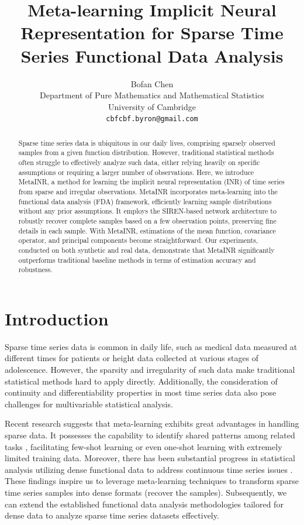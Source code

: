 \documentclass{article}
\title{Meta-learning Implicit Neural Representation for Sparse Time Series Functional Data Analysis}
\author{%
  Bofan Chen\\
  Department of Pure Mathematics and Mathematical Statistics\\
  University of Cambridge\\
  \texttt{cbfcbf.byron@gmail.com} \\}
\begin{document}
\maketitle

\begin{abstract}
  Sparse time series data is ubiquitous in our daily lives, comprising sparsely observed samples from a given function distribution.
  However, traditional statistical methods often struggle to effectively analyze such data, either relying heavily on specific assumptions or requiring a larger number of observations.  Here, we introduce MetaINR, a method for learning the implicit neural representation (INR) of time series from sparse and irregular observations.
  MetaINR incorporates meta-learning into the functional data analysis (FDA) framework, 
  efficiently learning sample distributions without any prior assumptions.
  It employs the SIREN-based network architecture to robustly recover complete samples based on a few observation points, preserving fine details in each sample. 
  With MetaINR, estimations of the mean function, covariance operator, and principal components become straightforward.
  Our experiments, conducted on both synthetic and real data, demonstrate that MetaINR significantly outperforms traditional baseline methods in terms of estimation accuracy and robustness.
\end{abstract}

\section{Introduction}
Sparse time series data is common in daily life, such as medical data measured at different times for patients or height data collected at various stages of adolescence. 
However, the sparsity and irregularity of such data make traditional statistical methods hard to apply directly. 
Additionally, the consideration of continuity and differentiability properties in most time series data also pose challenges for multivariable statistical analysis.

Recent research suggests that meta-learning \cite{finn2017model,hospedales2021meta,beck2023survey} exhibits great advantages in handling sparse data. 
It possesses the capability to identify shared patterns among related tasks \cite{raghu2019rapid}, 
facilitating few-shot learning or even one-shot learning \cite{sun2019meta} with extremely limited training data. 
Moreover, there has been substantial progress in statistical analysis utilizing dense functional data to address continuous time series issues \cite{wang2016functional}. 
These findings inspire us to leverage meta-learning techniques to transform sparse time series samples into dense formats (recover the samples).
Subsequently, we can extend the established functional data analysis methodologies tailored for dense data to analyze sparse time series datasets effectively.
\end{document}
